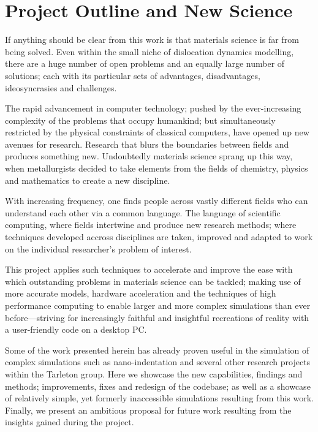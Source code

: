 \section{Project Outline and New Science}
\label{s:objectives}

If anything should be clear from this work is that materials science is far from being solved. Even within the small niche of dislocation dynamics modelling, there are a huge number of open problems and an equally large number of solutions; each with its particular sets of advantages, disadvantages, ideosyncrasies and challenges.

The rapid advancement in computer technology; pushed by the ever-increasing complexity of the problems that occupy humankind; but simultaneously restricted by the physical constraints of classical computers, have opened up new avenues for research. Research that blurs the boundaries between fields and produces something new. Undoubtedly materials science sprang up this way, when metallurgists decided to take elements from the fields of chemistry, physics and mathematics to create a new discipline.

With increasing frequency, one finds people across vastly different fields who can understand each other via a common language. The language of scientific computing, where fields intertwine and produce new research methods; where techniques developed accross disciplines are taken, improved and adapted to work on the individual researcher's problem of interest.

This project applies such techniques to accelerate and improve the ease with which outstanding problems in materials science can be tackled; making use of more accurate models, hardware acceleration and the techniques of high performance computing to enable larger and more complex simulations than ever before---striving for increasingly faithful and insightful recreations of reality with a user-friendly code on a desktop PC.

Some of the work presented herein has already proven useful in the simulation of complex simulations such as nano-indentation \cite{YU2018} and several other research projects within the Tarleton group. Here we showcase the new capabilities, findings and methods; improvements, fixes and redesign of the codebase; as well as a showcase of relatively simple, yet formerly inaccessible simulations resulting from this work. Finally, we present an ambitious proposal for future work resulting from the insights gained during the project.
\savearabiccounter
